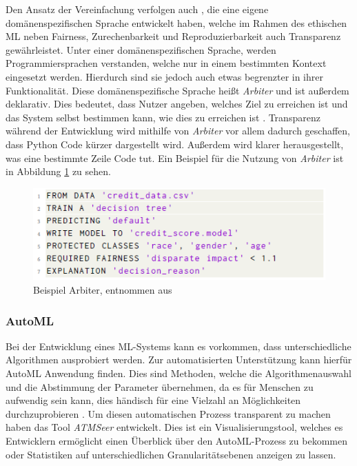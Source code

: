 Den Ansatz der Vereinfachung verfolgen auch \cite{zucker2020arbiter}, die eine eigene domänenspezifischen Sprache entwickelt haben, welche im Rahmen des ethischen ML neben Fairness, Zurechenbarkeit und Reproduzierbarkeit auch Transparenz gewährleistet. Unter einer domänenspezifischen Sprache, werden Programmiersprachen verstanden, welche nur in einem bestimmten Kontext eingesetzt werden. Hierdurch sind sie jedoch auch etwas begrenzter in ihrer Funktionalität. Diese domänenspezifische Sprache heißt \emph{Arbiter} und ist außerdem deklarativ. Dies bedeutet, dass Nutzer angeben, welches Ziel zu erreichen ist und das System selbst bestimmen kann, wie dies zu erreichen ist \cite{van2004concepts}. Transparenz während der Entwicklung wird mithilfe von \emph{Arbiter} vor allem dadurch geschaffen, dass Python Code kürzer dargestellt wird. Außerdem wird klarer herausgestellt, was eine bestimmte Zeile Code tut. Ein Beispiel für die Nutzung von \emph{Arbiter} ist in Abbildung \ref{Fig:Arbiter} zu sehen.
\begin{figure}
    \centering
    \includegraphics[scale=0.8]{pic/MA-Bilder/Literaturrecherche/45-CodeSnippet.PNG}
    \caption{Beispiel Arbiter, entnommen aus \cite{zucker2020arbiter}}
    \label{Fig:Arbiter}
\end{figure}

\subsubsection{AutoML}
Bei der Entwicklung eines ML-Systems kann es vorkommen, dass unterschiedliche Algorithmen ausprobiert werden. Zur automatisierten Unterstützung kann hierfür AutoML Anwendung finden. Dies sind Methoden, welche die Algorithmenauswahl und die Abstimmung der Parameter übernehmen, da es für Menschen zu aufwendig sein kann, dies händisch für eine Vielzahl an Möglichkeiten durchzuprobieren \cite{wang2019atmseer}. Um diesen automatischen Prozess transparent zu machen haben \cite{wang2019atmseer} das Tool \emph{ATMSeer} entwickelt. Dies ist ein Visualisierungstool, welches es Entwicklern ermöglicht einen Überblick über den AutoML-Prozess zu bekommen oder Statistiken auf unterschiedlichen Granularitätsebenen anzeigen zu lassen. 

